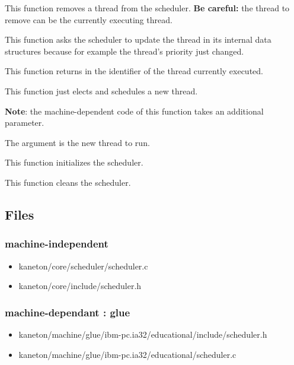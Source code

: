 {
  This function removes a thread from the
  scheduler. \textbf{Be careful:} the thread to remove can be
  the currently executing thread.
}

{
  This function asks the scheduler to update the thread
   in its internal data structures because
  for example the thread's priority just changed.
}

{
  This function returns in  the identifier
  of the thread currently executed.
}

{
  This function just elects and schedules a new thread.

  \textbf{Note}: the machine-dependent code of this function
  takes an additional parameter.

  {
    The argument  is the new
    thread to run.
  }
}

{
  This function initializes the scheduler.
}

{
  This function cleans the scheduler.
}

\subsection*{Files}

\subsubsection{\color{filerefcolor} machine-independent}
\begin{itemize}
\item kaneton/core/scheduler/scheduler.c
\item kaneton/core/include/scheduler.h
\end{itemize}

\subsubsection{\color{filerefcolor} machine-dependant : glue}
\begin{itemize}
\item kaneton/machine/glue/ibm-pc.ia32/educational/include/scheduler.h
\item kaneton/machine/glue/ibm-pc.ia32/educational/scheduler.c
\end{itemize}


